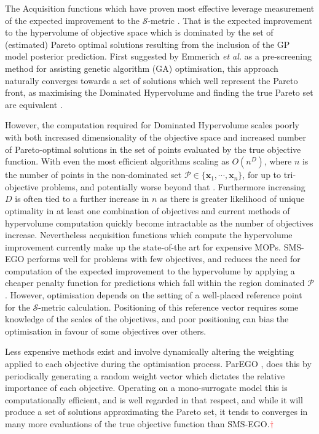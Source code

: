 \documentclass[conference]{IEEEtran}
\makeatletter
\newcommand\hpv{Dominated Hypervolume\xspace}
\newcommand\smsego{SMS-EGO\xspace}
\newcommand\gp{GP\xspace}
\newcommand{\bx}{\mathbf{x}}
\newcommand{\mnote}[2][\textcolor{red}{\dagger}]{$#1$\marginpar{\color{red}\raggedright\tiny$#1$
    #2}}
\newcommand*{\etal}{\textit{et al.}\@\xspace}
\makeatother
\begin{document}
The Acquisition functions which have proven most effective leverage measurement of the expected improvement to the $\mathcal{S}$-metric  \cite{emmerich2008computation}. That is the expected improvement to the hypervolume of objective space which is dominated by the set of (estimated) Pareto optimal solutions resulting from the inclusion of the \gp model posterior prediction. First suggested by Emmerich \etal  \cite{emmerich2006single} as a pre-screening method for assisting genetic algorithm (GA) optimisation, this approach naturally converges towards a set of solutions which well represent the Pareto front, as maximising the \hpv and finding the true Pareto set are equivalent \cite{fleischer2003measure}. 

However, the computation required for \hpv scales poorly with both increased dimensionality of the objective space and increased number of Pareto-optimal solutions in the set of points evaluated by the true objective function. With even the most efficient algorithms scaling as $O(n^D)$, where $n$ is the number of points in the non-dominated set $\mathcal{P}\in\{\bx_1, \cdots, \bx_n\}$, for up to tri-objective problems, and potentially worse beyond that \cite{hupkens2014faster}. Furthermore increasing $D$ is often tied to a further increase in $n$ as there is greater likelihood of unique optimality in at least one combination of objectives and current methods of hypervolume computation quickly become intractable as the number of objectives increase. Nevertheless acquisition functions which compute the hypervolume improvement currently make up the state-of-the art for expensive MOPs. \smsego \cite{ponweiser2008multiobjective, wagner2010expected} performs well for problems with few objectives, and reduces the need for computation of the expected improvement to the hypervolume by applying a cheaper penalty function for predictions which fall within the region dominated $\mathcal{P}$. However, optimisation depends on the setting of a well-placed reference point for the $\mathcal{S}$-metric calculation. Positioning of this reference vector requires some knowledge of the scales of the objectives, and poor positioning can bias the optimisation in favour of some objectives over others. 

Less expensive methods exist and involve dynamically altering the weighting applied to each objective during the optimisation process. ParEGO \cite{knowles2006parego}, does this by periodically generating a random weight vector which dictates the relative importance of each objective. Operating on a mono-surrogate model this is computationally efficient, and is well regarded in that respect, and while it will produce a set of solutions approximating the Pareto set, it tends to converges in many more evaluations of the true objective function than \smsego.\mnote{think you nee a citation for this claim}
\end{document}
